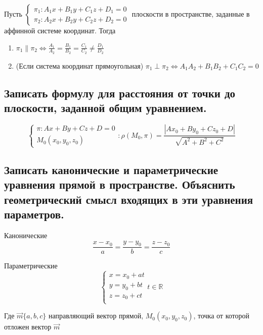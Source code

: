 Пусть $\begin{cases}\pi_1: A_1x+B_1y+C_1z+D_1 = 0\\\pi_2: A_2x+B_2y+C_2z+D_2 = 0\end{cases}$
плоскости в пространстве, заданные в аффинной системе координат. Тогда 
\begin{enumerate}
    \item $\pi_1 \parallel \pi_2 \iff \frac{A_1}{A_2} = \frac{B_1}{B_2} = \frac{C_1}{C_2} \ne \frac{D_1}{D_2}$
    \item (Если система координат прямоугольная) $\pi_1 \perp \pi_2 \iff A_1A_2 + B_1B_2 + C_1C_2 = 0$
\end{enumerate} 


\subsection{Записать формулу для расстояния от точки до плоскости, заданной общим уравнением. }

$$\begin{cases}\pi: Ax+By+Cz+D = 0\\M_0(x_0,y_0,z_0)\end{cases}: \rho(M_0,\pi) = 
\frac{ |Ax_0+By_0+Cz_0+D| }{\sqrt{A^2+B^2+C^2}}$$

\subsection{Записать канонические и параметрические уравнения прямой в пространстве. 
Объяснить геометрический смысл входящих в эти уравнения параметров.}

Канонические 
$$ \frac{x-x_0}{a} = \frac{y-y_0}{b} = \frac{z-z_0}{c}$$

Параметрические
$$\begin{cases}x = x_0 + at\\y = y_0 + bt\\z = z_0 + ct\\\end{cases} t \in \mathbb{R}$$

Где $\vec{m}\{a,b,c\}$ направляющий вектор прямой, $M_0(x_0,y_0,z_0)$, точка
от которой отложен вектор $\vec{m}$

